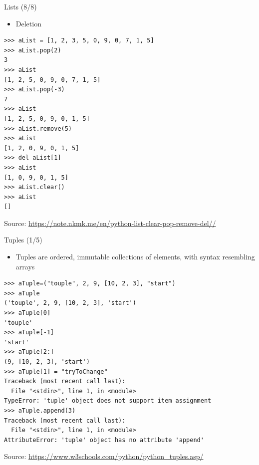 \documentclass{beamer}
\begin{document}
\begin{frame}[fragile]
{\centerline{Lists (8/8)}}
\begin{itemize}
    \item Deletion
\end{itemize} 
\begin{lstlisting}[style=myPythonStyle]
>>> aList = [1, 2, 3, 5, 0, 9, 0, 7, 1, 5]
>>> aList.pop(2)
3
>>> aList
[1, 2, 5, 0, 9, 0, 7, 1, 5]
>>> aList.pop(-3)
7
>>> aList
[1, 2, 5, 0, 9, 0, 1, 5]
>>> aList.remove(5)
>>> aList
[1, 2, 0, 9, 0, 1, 5]
>>> del aList[1]
>>> aList
[1, 0, 9, 0, 1, 5]
>>> aList.clear()
>>> aList
[]
\end{lstlisting}


\begin{center}
\tiny Source: \url{https://note.nkmk.me/en/python-list-clear-pop-remove-del//}
\end{center}

\end{frame}

\begin{frame}[fragile]
{\centerline{Tuples (1/5)}}
\begin{itemize}
    \item Tuples are ordered, immutable collections of elements, with syntax resembling arrays
\end{itemize} 
\begin{lstlisting}[style=myPythonStyle]
>>> aTuple=("touple", 2, 9, [10, 2, 3], "start")
>>> aTuple
('touple', 2, 9, [10, 2, 3], 'start')
>>> aTuple[0]
'touple'
>>> aTuple[-1]
'start'
>>> aTuple[2:]
(9, [10, 2, 3], 'start')
>>> aTuple[1] = "tryToChange"
Traceback (most recent call last):
  File "<stdin>", line 1, in <module>
TypeError: 'tuple' object does not support item assignment
>>> aTuple.append(3)
Traceback (most recent call last):
  File "<stdin>", line 1, in <module>
AttributeError: 'tuple' object has no attribute 'append'

\end{lstlisting}


\begin{center}
\tiny Source: \url{https://www.w3schools.com/python/python_tuples.asp/}
\end{center}

\end{frame}
\end{document}
